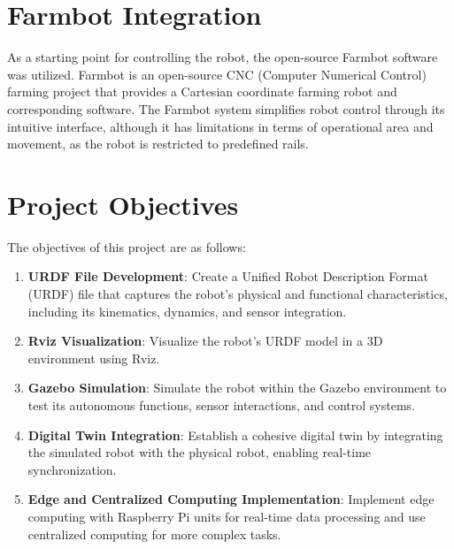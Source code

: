 \section{Farmbot Integration}
As a starting point for controlling the robot, the open-source Farmbot software was utilized. Farmbot is an open-source CNC (Computer Numerical Control) farming project that provides a Cartesian coordinate farming robot and corresponding software. The Farmbot system simplifies robot control through its intuitive interface, although it has limitations in terms of operational area and movement, as the robot is restricted to predefined rails.

\section{Project Objectives}
The objectives of this project are as follows:
\begin{enumerate}
    \item \textbf{URDF File Development}: Create a Unified Robot Description Format (URDF) file that captures the robot's physical and functional characteristics, including its kinematics, dynamics, and sensor integration.
    \item \textbf{Rviz Visualization}: Visualize the robot’s URDF model in a 3D environment using Rviz.
    \item \textbf{Gazebo Simulation}: Simulate the robot within the Gazebo environment to test its autonomous functions, sensor interactions, and control systems.
    \item \textbf{Digital Twin Integration}: Establish a cohesive digital twin by integrating the simulated robot with the physical robot, enabling real-time synchronization.
    \item \textbf{Edge and Centralized Computing Implementation}: Implement edge computing with Raspberry Pi units for real-time data processing and use centralized computing for more complex tasks.
\end{enumerate}


